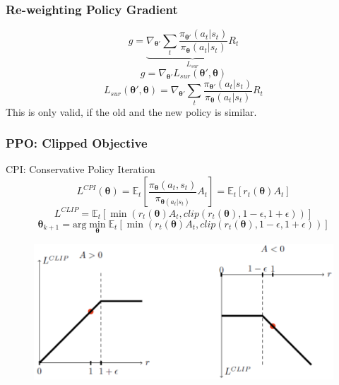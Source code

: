 \subsubsection*{Re-weighting Policy Gradient}
\begin{equation*}
        g = \underbrace{\nabla_{\boldsymbol{\theta}'}\sum_{t}^{}\frac{
    \pi_{\boldsymbol{\theta}'}(a_t|s_t)
    }{
    \pi_{\boldsymbol{\theta}}(a_t|s_t)
    }R_t}_{L_{sur}}
\end{equation*}
\begin{equation*}
    g = \nabla_{\boldsymbol{\theta}'}L_{sur}(\boldsymbol{\theta}',\boldsymbol{\theta})
\end{equation*}
\begin{equation}
    L_{sur}(\boldsymbol{\theta}',\boldsymbol{\theta}) = \nabla_{\boldsymbol{\theta}'}\sum_{t}^{}\frac{
        \pi_{\boldsymbol{\theta}'}(a_t|s_t)
        }{
        \pi_{\boldsymbol{\theta}}(a_t|s_t)
        }R_t
\end{equation}
This is only valid, if the old and the new policy is similar.

\subsubsection{PPO: Clipped Objective}
CPI: Conservative Policy Iteration 
\begin{equation*}
    L^{CPI}(\boldsymbol{\theta}) = \mathbb{E}_t\left[\frac{
        \pi_{\boldsymbol{\theta}}(a_t,s_t)
        }{
            \pi_{\boldsymbol{\theta}(a_t|s_t)}
        }A_t\right] = \mathbb{E}_t\left[r_t(\boldsymbol{\theta})A_t\right]
\end{equation*}
\begin{equation*}
    L^{CLIP} = \mathbb{E}_t\left[
        \min(r_t(\boldsymbol{\theta})A_t,clip(r_t(\boldsymbol{\theta}),1-\epsilon,1+\epsilon))
    \right]
\end{equation*}
\begin{equation*}
    \boldsymbol{\theta}_{k+1} = \text{arg}\min_{\boldsymbol{\theta}}\mathbb{E}_t\left[
        \min(r_t(\boldsymbol{\theta})A_t,clip(r_t(\boldsymbol{\theta}),1-\epsilon,1+\epsilon))
    \right]
\end{equation*}
\begin{figure}[!h]
    \centering
    \includegraphics[width = 0.5\columnwidth]{figures/DeepReinforcementLearning3/PPOClip.png}
\end{figure}
